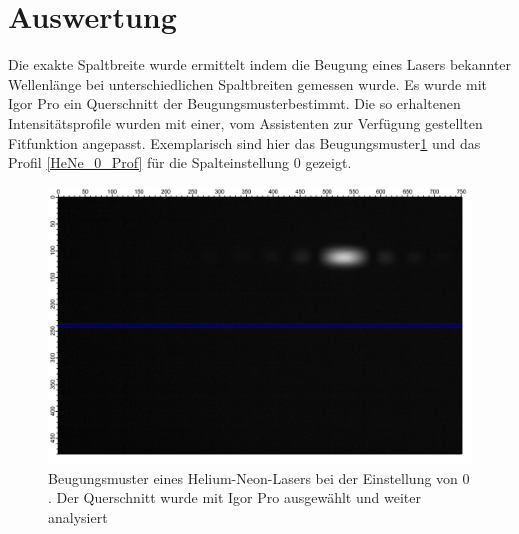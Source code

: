 %
%
\section {Auswertung}
Die exakte Spaltbreite wurde ermittelt indem die Beugung eines Lasers bekannter Wellenlänge bei unterschiedlichen Spaltbreiten gemessen wurde. Es wurde mit Igor Pro ein Querschnitt der Beugungsmusterbestimmt. Die so erhaltenen Intensitätsprofile wurden mit einer, vom Assistenten zur Verfügung gestellten Fitfunktion angepasst. Exemplarisch sind hier das Beugungsmuster\ref{HeNe_0} und das Profil \ref{HeNe_0_Prof} für die Spalteinstellung $0$ gezeigt.

\begin{figure}[H]
	\centering	
	\begin{minipage}{1\textwidth}
		\includegraphics[width=\columnwidth]{180618/Graph0.png}
	\end{minipage}
	\caption{Beugungsmuster eines Helium-Neon-Lasers bei der Einstellung von $0$. Der Querschnitt wurde mit Igor Pro ausgewählt und weiter analysiert }
	\label{HeNe_0}
\end{figure}


